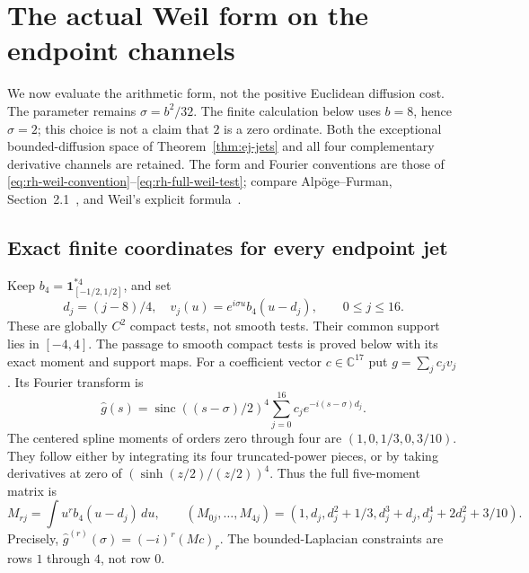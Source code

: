 \section[Endpoint channels: actual Weil form]{The actual Weil form on the endpoint channels}
\label{sec:endpoint-Weil}

We now evaluate the arithmetic form, not the positive Euclidean diffusion
cost. The parameter remains $\sigma=b^2/32$. The finite calculation below
uses $b=8$, hence $\sigma=2$; this choice is not a claim that $2$ is a
zero ordinate. Both the exceptional bounded-diffusion space of
Theorem~\ref{thm:ej-jets} and all four complementary derivative channels
are retained. The form and Fourier conventions are those of
\eqref{eq:rh-weil-convention}--\eqref{eq:rh-full-weil-test}; compare
Alp\"oge--Furman, Section~2.1~\cite{alpogeFurman2026}, and
Weil's explicit formula~\cite{weil1952}.

\subsection{Exact finite coordinates for every endpoint jet}

Keep $b_4=\mathbf1_{[-1/2,1/2]}^{*4}$, and set
\[
 d_j=(j-8)/4,\quad v_j(u)=e^{i\sigma u}b_4(u-d_j),\qquad 0\le j\le16.
\]
These are globally $C^2$ compact tests, not smooth tests. Their common
support lies in $[-4,4]$. The passage to smooth compact tests is proved
below with its exact moment and support maps.
For a coefficient vector $c\in\mathbb C^{17}$ put $g=\sum_jc_jv_j$.
Its Fourier transform is
\begin{equation}
 \widehat g(s)=\operatorname{sinc}((s-\sigma)/2)^4
                 \sum_{j=0}^{16}c_je^{-i(s-\sigma)d_j}.
 \label{eq:ew-Fourier}
\end{equation}
The centered spline moments of orders zero through four are
$(1,0,1/3,0,3/10)$. They follow either by integrating its four
truncated-power pieces, or by taking derivatives at zero of
$(\sinh(z/2)/(z/2))^4$. Thus the full five-moment matrix is
\begin{equation}
 M_{rj}=\int u^r b_4(u-d_j)\,du,\qquad
 (M_{0j},\ldots,M_{4j})=
 (1,d_j,d_j^2+1/3,d_j^3+d_j,d_j^4+2d_j^2+3/10).
 \label{eq:ew-moments}
\end{equation}
Precisely, $\widehat g^{(r)}(\sigma)=(-i)^r(Mc)_r$.
The bounded-Laplacian constraints are rows $1$ through $4$, not row $0$.

